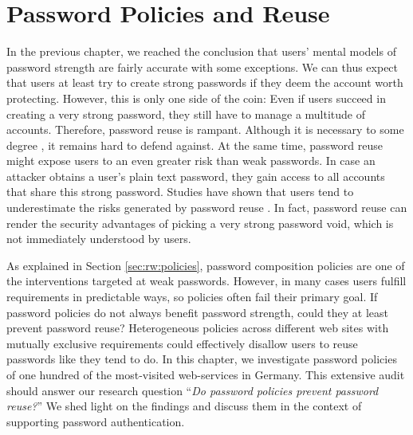 \chapter[Password Policies and Reuse]{Password Policies and Reuse}\label{chap:policies_reuse}
In the previous chapter, we reached the conclusion that users' mental models of password strength are fairly accurate with some exceptions. We can thus expect that users at least try to create strong passwords if they deem the account worth protecting. 
However, this is only one side of the coin: Even if users succeed in creating a very strong password, they still have to manage a multitude of accounts. Therefore, password reuse is rampant. Although it is necessary to some degree \cite{Florencio2014PasswordPortfoliosFiniteUser, ZhangKennedy2016RevisitingPasswordRules}, it remains hard to defend against.  At the same time, password reuse might expose users to an even greater risk than weak passwords.  In case an attacker obtains a user's plain text password, they gain access to all accounts that share this strong password. Studies have shown that users tend to underestimate the risks generated by password reuse \cite{Kaspersky2016ConsumerSecurityReport}. In fact, password reuse can render the security advantages of picking a very strong password void, which is not immediately understood by users.

As explained in Section \ref{sec:rw:policies}, password composition policies are one of the interventions targeted at weak passwords. However, in many cases users fulfill requirements in predictable ways, so policies often fail their primary goal. If password policies do not always benefit password strength, could they at least prevent password reuse? Heterogeneous policies across different web sites with mutually exclusive requirements could effectively disallow users to reuse passwords like they tend to do. In this chapter, we investigate password policies of one hundred of the most-visited web-services in Germany. This extensive audit should answer our research question ``\textit{Do password policies prevent password reuse?}'' We shed light on the findings and discuss them in the context of supporting password authentication.  


